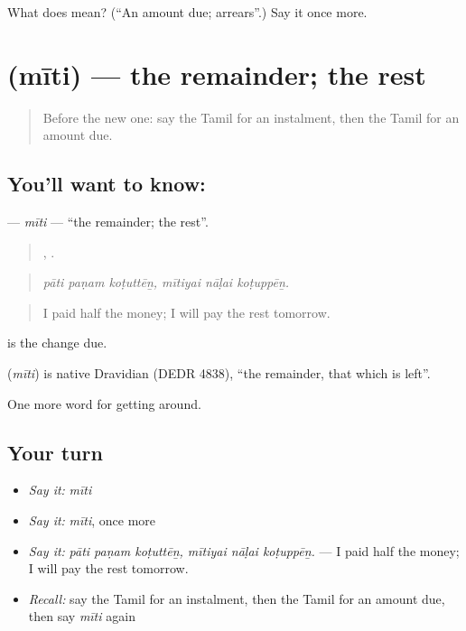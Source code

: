 \begin{tcolorbox}[breakable,colback=teal!4,colframe=teal!35!black,title={Before you move on}]
What does  mean? (\textquotedblleft{}An amount due; arrears\textquotedblright{}.) Say it once more.
\end{tcolorbox}
\section[\texorpdfstring{\ta{மீதி} (mīti)}{மீதி (mīti)}]{ (mīti) — the remainder; the rest}

\label{lesson:TA-C447-miti}



\begin{quote}
Before the new one: say the Tamil for an instalment, then the Tamil for an amount due.
\end{quote}

\subsection*{You'll want to know: }
\textbf{} — \emph{mīti} — \textquotedblleft{}the remainder; the rest\textquotedblright{}.

\begin{quote}
  ,   .
\end{quote}

\begin{quote}
\emph{pāti paṇam koṭuttēṉ, mītiyai nāḷai koṭuppēṉ.}
\end{quote}

\begin{quote}
I paid half the money; I will pay the rest tomorrow.
\end{quote}

  is the change due.

\begin{cousinweb}
\textbf{} (\emph{mīti}) is native Dravidian (DEDR 4838), \textquotedblleft{}the remainder, that which is left\textquotedblright{}.
\end{cousinweb}

\begin{grammarlens}[title={What you've built}]
One more word for getting around.
\end{grammarlens}

\subsection*{Your turn}
\begin{itemize}
\raggedright
  \item \emph{Say it:} \emph{mīti}
  \item \emph{Say it:} \emph{mīti}, once more
  \item \emph{Say it:} \emph{pāti paṇam koṭuttēṉ, mītiyai nāḷai koṭuppēṉ.} — I paid half the money; I will pay the rest tomorrow.
  \item \emph{Recall:} say the Tamil for an instalment, then the Tamil for an amount due, then say \emph{mīti} again
\end{itemize}

